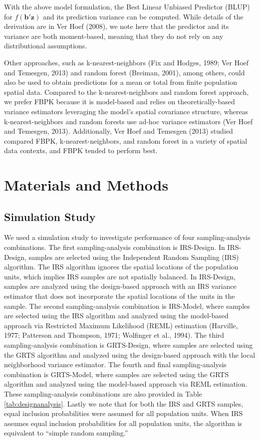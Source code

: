 \documentclass[]{elsarticle} %
\begin{document}
With the above model formulation, the Best Linear Unbiased Predictor
(BLUP) for \(f(\mathbf{b}'\mathbf{z})\) and its prediction variance can
be computed. While details of the derivation are in Ver Hoef (2008), we
note here that the predictor and its variance are both moment-based,
meaning that they do not rely on any distributional assumptions.

Other approaches, such as k-nearest-neighbors (Fix and Hodges, 1989; Ver
Hoef and Temesgen, 2013) and random forest (Breiman, 2001), among
others, could also be used to obtain predictions for a mean or total
from finite population spatial data. Compared to the k-nearest-neighbors
and random forest approach, we prefer FBPK because it is model-based and
relies on theoretically-based variance estimators leveraging the model's
spatial covariance structure, whereas k-nearest-neighbors and random
forests use ad-hoc variance estimators (Ver Hoef and Temesgen, 2013).
Additionally, Ver Hoef and Temesgen (2013) studied compared FBPK,
k-nearest-neighbors, and random forest in a variety of spatial data
contexts, and FBPK tended to perform best.

\hypertarget{sec:mm}{%
\section{Materials and Methods}\label{sec:mm}}

\hypertarget{sec:mm_sim}{%
\subsection{Simulation Study}\label{sec:mm_sim}}

We used a simulation study to investigate performance of four
sampling-analysis combinations. The first sampling-analysis combination
is IRS-Design. In IRS-Design, samples are selected using the Independent
Random Sampling (IRS) algorithm. The IRS algorithm ignores the spatial
locations of the population units, which implies IRS samples are not
spatially balanced. In IRS-Design, samples are analyzed using the
design-based approach with an IRS variance estimator that does not
incorporate the spatial locations of the units in the sample. The second
sampling-analysis combination is IRS-Model, where samples are selected
using the IRS algorithm and analyzed using the model-based approach via
Restricted Maximum Likelihood (REML) estimation (Harville, 1977;
Patterson and Thompson, 1971; Wolfinger et al., 1994). The third
sampling-analysis combination is GRTS-Design, where samples are selected
using the GRTS algorithm and analyzed using the design-based approach
with the local neighborhood variance estimator. The fourth and final
sampling-analysis combination is GRTS-Model, where samples are selected
using the GRTS algorithm and analyzed using the model-based approach via
REML estimation. These sampling-analysis combinations are also provided
in Table \ref{tab:designanalysis}. Lastly we note that for both the IRS
and GRTS samples, equal inclusion probabilities were assumed for all
population units. When IRS assumes equal inclusion probabilities for all
population units, the algorithm is equivalent to ``simple random
sampling.''
\end{document}
